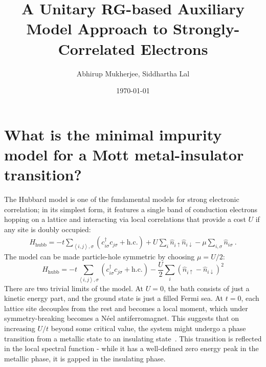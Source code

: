 \documentclass[reprint,hidelinks,onecolumn]{revtex4-2}
\begin{document}
\title{\bf A Unitary RG-based Auxiliary Model Approach to Strongly-Correlated Electrons}
\author{Abhirup Mukherjee, Siddhartha Lal}
\date{\today}
\maketitle
\tableofcontents

\section{What is the minimal impurity model for a Mott metal-insulator transition?}
The Hubbard model is one of the fundamental models for strong electronic correlation; in its simplest form, it features a single band of conduction electrons hopping on a lattice and interacting via local correlations that provide a cost \(U\) if any site is doubly occupied:
\begin{equation}\begin{aligned}
	H_\text{hubb} = -t\sum_{\left<i,j \right>,\sigma}\left(c^\dagger_{i\sigma}c_{j\sigma}+\text{h.c.}\right) + U\sum_i \hat n_{i \uparrow} \hat n_{i \downarrow} - \mu \sum_{i,\sigma}\hat n_{i\sigma}~.
\end{aligned}\end{equation}
The model can be made particle-hole symmetric by choosing \(\mu = U/2\):
\[H_\text{hubb} = -t\sum_{\left<i,j \right>,\sigma}\left(c^\dagger_{i\sigma}c_{j\sigma}+\text{h.c.}\right) - \frac{U}{2}\sum_i \left(\hat n_{i \uparrow} - \hat n_{i \downarrow}\right)^2\]
There are two trivial limits of the model. At \(U=0\), the bath consists of just a kinetic energy part, and the ground state is just a filled Fermi sea. At \(t=0\), each lattice site decouples from the rest and becomes a local moment, which under symmetry-breaking becomes a Néel antiferromagnet. This suggests that on increasing \(U/t\) beyond some critical value, the system might undergo a phase transition from a metallic state to an insulating state~\cite{Mott_1949}. This transition is reflected in the local spectral function - while it has a well-defined zero energy peak in the metallic phase, it is gapped in the insulating phase.
\end{document}
